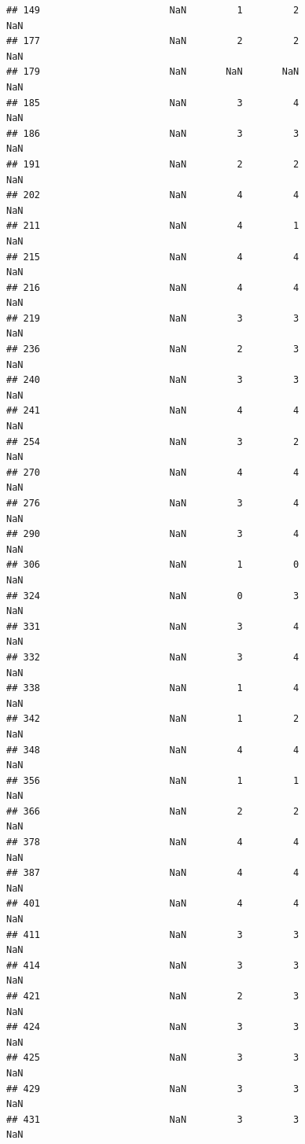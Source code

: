 \documentclass[
]{article}
\begin{document}
\begin{verbatim}
## 149                       NaN         1         2                NaN
## 177                       NaN         2         2                NaN
## 179                       NaN       NaN       NaN                NaN
## 185                       NaN         3         4                NaN
## 186                       NaN         3         3                NaN
## 191                       NaN         2         2                NaN
## 202                       NaN         4         4                NaN
## 211                       NaN         4         1                NaN
## 215                       NaN         4         4                NaN
## 216                       NaN         4         4                NaN
## 219                       NaN         3         3                NaN
## 236                       NaN         2         3                NaN
## 240                       NaN         3         3                NaN
## 241                       NaN         4         4                NaN
## 254                       NaN         3         2                NaN
## 270                       NaN         4         4                NaN
## 276                       NaN         3         4                NaN
## 290                       NaN         3         4                NaN
## 306                       NaN         1         0                NaN
## 324                       NaN         0         3                NaN
## 331                       NaN         3         4                NaN
## 332                       NaN         3         4                NaN
## 338                       NaN         1         4                NaN
## 342                       NaN         1         2                NaN
## 348                       NaN         4         4                NaN
## 356                       NaN         1         1                NaN
## 366                       NaN         2         2                NaN
## 378                       NaN         4         4                NaN
## 387                       NaN         4         4                NaN
## 401                       NaN         4         4                NaN
## 411                       NaN         3         3                NaN
## 414                       NaN         3         3                NaN
## 421                       NaN         2         3                NaN
## 424                       NaN         3         3                NaN
## 425                       NaN         3         3                NaN
## 429                       NaN         3         3                NaN
## 431                       NaN         3         3                NaN

\end{verbatim}
\end{document}
